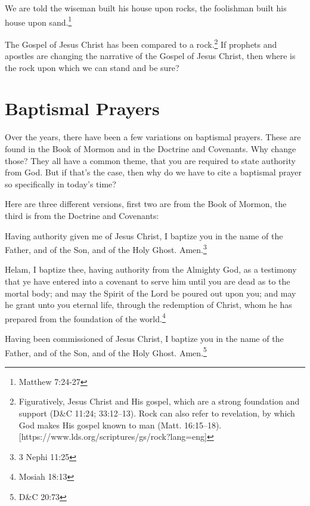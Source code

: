 \documentclass{article}
\begin{document}
We are told the wiseman built his house upon rocks, the foolishman built his
house upon sand.\footnote{Matthew 7:24-27}

The Gospel of Jesus Christ has been compared to a rock.\footnote{Figuratively, 
Jesus Christ and His gospel, which are a strong foundation and support 
(D\&C 11:24; 33:12–13). Rock can also refer to revelation, 
by which God makes His gospel known to man (Matt. 16:15–18).
[https://www.lds.org/scriptures/gs/rock?lang=eng]} If prophets and apostles
are changing the narrative of the Gospel of Jesus Christ, then where is the
rock upon which we can stand and be sure?

\newpage

\section{Baptismal Prayers}

Over the years, there have been a few variations on baptismal prayers. These
are found in the Book of Mormon and in the Doctrine and Covenants. Why change
those? They all have a common theme, that you are required to state authority
from God. But if that's the case, then why do we have to cite a baptismal
prayer so specifically in today's time?

Here are three different versions, first two are from the Book of Mormon, the
third is from the Doctrine and Covenants:

\begin{displayquote}
Having authority given me of Jesus Christ, I baptize you in the name of the 
Father, and of the Son, and of the Holy Ghost. Amen.\footnote{3 Nephi 11:25}
\end{displayquote}

\begin{displayquote}
Helam, I baptize thee, having authority from the Almighty God, 
as a testimony that ye have entered into a covenant to serve him 
until you are dead as to the mortal body; and may the Spirit of 
the Lord be poured out upon you; and may he grant unto you 
eternal life, through the redemption of Christ, 
whom he has prepared from the foundation of the world.\footnote{Mosiah 18:13}
\end{displayquote}

\begin{displayquote}
Having been commissioned of Jesus Christ, I baptize you in the name of the 
Father, and of the Son, and of the Holy Ghost. Amen.\footnote{D\&C 20:73}
\end{displayquote}
\end{document}
